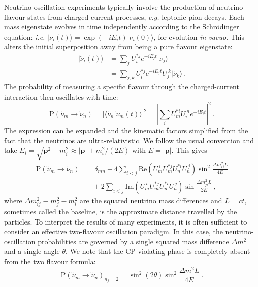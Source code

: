 Neutrino oscillation experiments typically involve the production of neutrino
flavour states from charged-current processes, \textit{e.g.} leptonic pion
decays. Each mass eigenstate evolves in time independently according to the
Schr\"{o}dinger equation: \textit{i.e.}
$| \nu_{i} (t) \rangle = \exp{(-i E_{i} t)} | \nu_{i} (0) \rangle$, for evolution
\textit{in vacuo}. This alters the initial superposition away from being a pure
flavour eigenstate:
\begin{align}
  | \breve{\nu}_{i} (t) \rangle &= \sum_{j} U_{i}^{* j} e^{-i E_{j} t} | \nu_{j} \rangle \\
                                &= \sum_{j,k} U_{i}^{* j} e^{-i E_{j} t} U_{j}^{\ k} | \breve{\nu}_{k} \rangle \ .
\end{align}
The probability of measuring a specific flavour through the charged-current
interaction then oscillates with time:
\begin{equation}
  \text{P}(\breve{\nu}_{m} \to \breve{\nu}_{n}) = | \langle \breve{\nu}_{n} | \breve{\nu}_{m} (t) \rangle |^{2} = \left| \sum_{i} U_{m}^{* i} U_{i}^{\ n} e^{-i E_{i} t} \right|^{2} \ .
\end{equation}
The expression can be expanded and the kinematic factors simplified from the
fact that the neutrinos are ultra-relativistic. We follow the usual convention
and take
$E_{i} = \sqrt{\mathbf{p}^{2} + m_{i}^{2}} \approx |\mathbf{p}| + m_{i}^{2} / (2 E)$
with $E = |\mathbf{p}|$. This gives
\begin{equation}
  \label{eq:ch1-neutrino-osc}
  \begin{aligned}
    \text{P}(\breve{\nu}_{m} \to \breve{\nu}_{n}) &= \delta_{mn} - 4 \sum_{i < j} \mathrm{Re}\left( U_{m}^{\ i} U_{m}^{* j} U_{n}^{* i} U_{n}^{\ j}  \right) \sin^{2} \frac{\Delta m_{ij}^{2} L}{4E}\\
    &\quad + 2 \sum_{i<j} \mathrm{Im}\left( U_{m}^{\ i} U_{m}^{* j} U_{n}^{* i} U_{n}^{\ j}  \right) \sin \frac{\Delta m^{2}_{ji} L}{2E} \ ,
  \end{aligned}
\end{equation}
where $\Delta m_{ij}^{2} \equiv m_{j}^{2} - m_{i}^{2}$ are the squared neutrino
mass differences and $L = ct$, sometimes called the baseline, is the approximate
distance travelled by the particles. To interpret the results of many
experiments, it is often sufficient to consider an effective two-flavour
oscillation paradigm. In this case, the neutrino-oscillation probabilities are
governed by a single squared mass difference $\Delta m^{2}$ and a single angle
$\theta$. We note that the CP-violating phase is completely absent from the two
flavour formula:
\begin{equation}
  \label{eq:ch1-two-flavour-osc}
  \text{P}(\breve{\nu}_{m} \to \breve{\nu}_{n})_{n_{f}=2} = \sin^{2} (2\theta) \sin^{2} \frac{\Delta m^{2} L}{4E} \ .
\end{equation}

